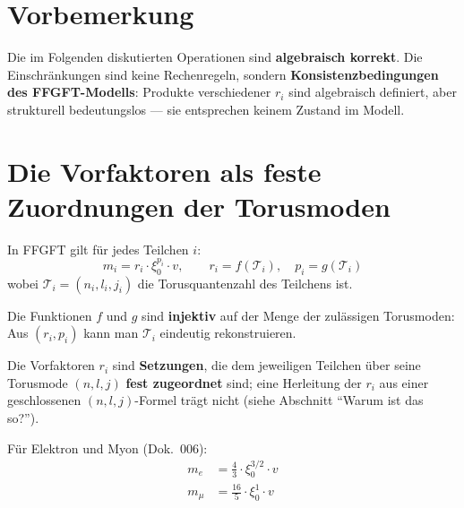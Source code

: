 
\section*{Vorbemerkung}

Die im Folgenden diskutierten Operationen sind \textbf{algebraisch korrekt}.
Die Einschränkungen sind keine Rechenregeln, sondern
\textbf{Konsistenzbedingungen des FFGFT-Modells}:
Produkte verschiedener $r_i$ sind algebraisch definiert,
aber strukturell bedeutungslos --- sie entsprechen keinem
Zustand im Modell.

\section{Die Vorfaktoren als feste Zuordnungen der Torusmoden}

In FFGFT gilt für jedes Teilchen $i$:
\begin{equation}
  m_i = r_i \cdot \xi_0^{p_i} \cdot v,
  \qquad r_i = f(\mathcal{T}_i), \quad p_i = g(\mathcal{T}_i)
\end{equation}
wobei $\mathcal{T}_i = (n_i, l_i, j_i)$ die Torusquantenzahl des Teilchens ist.

Die Funktionen $f$ und $g$ sind \textbf{injektiv} auf der Menge der
zulässigen Torusmoden: Aus $(r_i, p_i)$ kann man $\mathcal{T}_i$ eindeutig
rekonstruieren.

Die Vorfaktoren $r_i$ sind \textbf{Setzungen}, die dem jeweiligen
Teilchen über seine Torusmode $(n,l,j)$ \textbf{fest zugeordnet} sind;
eine Herleitung der $r_i$ aus einer geschlossenen $(n,l,j)$-Formel trägt
nicht (siehe Abschnitt \enquote{Warum ist das so?}).

Für Elektron und Myon (Dok.~006):
\begin{align}
  m_e &= \frac{4}{3} \cdot \xi_0^{3/2} \cdot v \label{eq:me}\\
  m_\mu &= \frac{16}{5} \cdot \xi_0^{1} \cdot v \label{eq:mmu}
\end{align}

